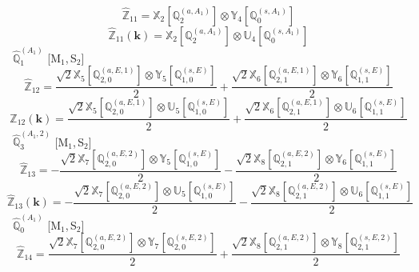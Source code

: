 \documentclass[fleqn,10pt,landscape]{article}
\begin{document}
\begin{itemize}
\begin{dmath*}
\hat{\mathbb{Z}}_{11}=\mathbb{X}_{2}[\mathbb{Q}_{2}^{(a,A_{1})}] \otimes\mathbb{Y}_{4}[\mathbb{Q}_{0}^{(s,A_{1})}]
\end{dmath*}
\begin{dmath*}
\hat{\mathbb{Z}}_{11}(\bm{k})=\mathbb{X}_{2}[\mathbb{Q}_{2}^{(a,A_{1})}] \otimes\mathbb{U}_{4}[\mathbb{Q}_{0}^{(s,A_{1})}]
\end{dmath*}
\vspace{4mm}
\noindent {} $\,\,\,\hat{\mathbb{Q}}_{1}^{(A_{1})}$ [M$_{1}$,\,S$_{2}$]
\begin{dmath*}
\hat{\mathbb{Z}}_{12}=\frac{\sqrt{2} \mathbb{X}_{5}[\mathbb{Q}_{2,0}^{(a,E,1)}] \otimes\mathbb{Y}_{5}[\mathbb{Q}_{1,0}^{(s,E)}]}{2} + \frac{\sqrt{2} \mathbb{X}_{6}[\mathbb{Q}_{2,1}^{(a,E,1)}] \otimes\mathbb{Y}_{6}[\mathbb{Q}_{1,1}^{(s,E)}]}{2}
\end{dmath*}
\begin{dmath*}
\hat{\mathbb{Z}}_{12}(\bm{k})=\frac{\sqrt{2} \mathbb{X}_{5}[\mathbb{Q}_{2,0}^{(a,E,1)}] \otimes\mathbb{U}_{5}[\mathbb{Q}_{1,0}^{(s,E)}]}{2} + \frac{\sqrt{2} \mathbb{X}_{6}[\mathbb{Q}_{2,1}^{(a,E,1)}] \otimes\mathbb{U}_{6}[\mathbb{Q}_{1,1}^{(s,E)}]}{2}
\end{dmath*}
\vspace{4mm}
\noindent {} $\,\,\,\hat{\mathbb{Q}}_{3}^{(A_{1},2)}$ [M$_{1}$,\,S$_{2}$]
\begin{dmath*}
\hat{\mathbb{Z}}_{13}=- \frac{\sqrt{2} \mathbb{X}_{7}[\mathbb{Q}_{2,0}^{(a,E,2)}] \otimes\mathbb{Y}_{5}[\mathbb{Q}_{1,0}^{(s,E)}]}{2} - \frac{\sqrt{2} \mathbb{X}_{8}[\mathbb{Q}_{2,1}^{(a,E,2)}] \otimes\mathbb{Y}_{6}[\mathbb{Q}_{1,1}^{(s,E)}]}{2}
\end{dmath*}
\begin{dmath*}
\hat{\mathbb{Z}}_{13}(\bm{k})=- \frac{\sqrt{2} \mathbb{X}_{7}[\mathbb{Q}_{2,0}^{(a,E,2)}] \otimes\mathbb{U}_{5}[\mathbb{Q}_{1,0}^{(s,E)}]}{2} - \frac{\sqrt{2} \mathbb{X}_{8}[\mathbb{Q}_{2,1}^{(a,E,2)}] \otimes\mathbb{U}_{6}[\mathbb{Q}_{1,1}^{(s,E)}]}{2}
\end{dmath*}
\vspace{4mm}
\noindent {} $\,\,\,\hat{\mathbb{Q}}_{0}^{(A_{1})}$ [M$_{1}$,\,S$_{2}$]
\begin{dmath*}
\hat{\mathbb{Z}}_{14}=\frac{\sqrt{2} \mathbb{X}_{7}[\mathbb{Q}_{2,0}^{(a,E,2)}] \otimes\mathbb{Y}_{7}[\mathbb{Q}_{2,0}^{(s,E,2)}]}{2} + \frac{\sqrt{2} \mathbb{X}_{8}[\mathbb{Q}_{2,1}^{(a,E,2)}] \otimes\mathbb{Y}_{8}[\mathbb{Q}_{2,1}^{(s,E,2)}]}{2}
\end{dmath*}
\begin{dmath*}

\end{dmath*}
\end{itemize}
\end{document}
